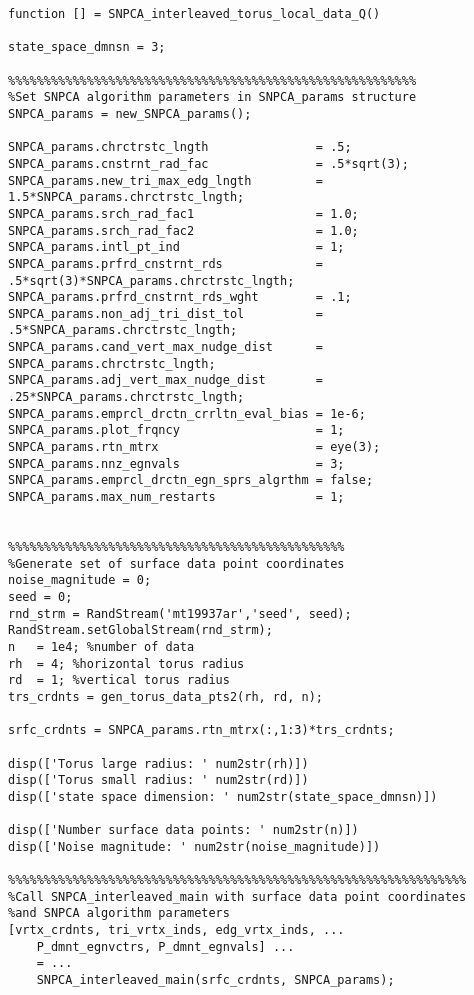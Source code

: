 \documentclass[11pt]{amsart}
\begin{document}
\begin{verbatim}
function [] = SNPCA_interleaved_torus_local_data_Q()

state_space_dmnsn = 3;

%%%%%%%%%%%%%%%%%%%%%%%%%%%%%%%%%%%%%%%%%%%%%%%%%%%%%%%%%
%Set SNPCA algorithm parameters in SNPCA_params structure
SNPCA_params = new_SNPCA_params();

SNPCA_params.chrctrstc_lngth               = .5;
SNPCA_params.cnstrnt_rad_fac               = .5*sqrt(3);
SNPCA_params.new_tri_max_edg_lngth         = 1.5*SNPCA_params.chrctrstc_lngth;
SNPCA_params.srch_rad_fac1                 = 1.0;
SNPCA_params.srch_rad_fac2                 = 1.0;
SNPCA_params.intl_pt_ind                   = 1;
SNPCA_params.prfrd_cnstrnt_rds             = .5*sqrt(3)*SNPCA_params.chrctrstc_lngth;
SNPCA_params.prfrd_cnstrnt_rds_wght        = .1;
SNPCA_params.non_adj_tri_dist_tol          = .5*SNPCA_params.chrctrstc_lngth;
SNPCA_params.cand_vert_max_nudge_dist      = SNPCA_params.chrctrstc_lngth;
SNPCA_params.adj_vert_max_nudge_dist       = .25*SNPCA_params.chrctrstc_lngth;    
SNPCA_params.emprcl_drctn_crrltn_eval_bias = 1e-6;
SNPCA_params.plot_frqncy                   = 1;
SNPCA_params.rtn_mtrx                      = eye(3);
SNPCA_params.nnz_egnvals                   = 3;
SNPCA_params.emprcl_drctn_egn_sprs_algrthm = false;
SNPCA_params.max_num_restarts              = 1;


%%%%%%%%%%%%%%%%%%%%%%%%%%%%%%%%%%%%%%%%%%%%%%%
%Generate set of surface data point coordinates
noise_magnitude = 0;
seed = 0;
rnd_strm = RandStream('mt19937ar','seed', seed);
RandStream.setGlobalStream(rnd_strm);
n   = 1e4; %number of data 
rh  = 4; %horizontal torus radius
rd  = 1; %vertical torus radius
trs_crdnts = gen_torus_data_pts2(rh, rd, n);

srfc_crdnts = SNPCA_params.rtn_mtrx(:,1:3)*trs_crdnts;

disp(['Torus large radius: ' num2str(rh)])
disp(['Torus small radius: ' num2str(rd)])
disp(['state space dimension: ' num2str(state_space_dmnsn)])

disp(['Number surface data points: ' num2str(n)])
disp(['Noise magnitude: ' num2str(noise_magnitude)])

%%%%%%%%%%%%%%%%%%%%%%%%%%%%%%%%%%%%%%%%%%%%%%%%%%%%%%%%%%%%%%%%
%Call SNPCA_interleaved_main with surface data point coordinates 
%and SNPCA algorithm parameters
[vrtx_crdnts, tri_vrtx_inds, edg_vrtx_inds, ...
    P_dmnt_egnvctrs, P_dmnt_egnvals] ... 
    = ...
    SNPCA_interleaved_main(srfc_crdnts, SNPCA_params);
\end{verbatim}
\end{document}
